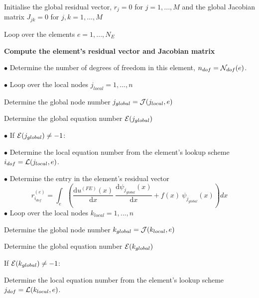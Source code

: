 \begin{DoxyItemize}
\item Initialise the global residual vector, $ r_j=0 $ for $j=1,...,M $ and the global Jacobian matrix $ J_{jk}=0 $ for $j,k=1,...,M $
\item Loop over the elements $ e=1,...,N_E$ \par
\par
 \begin{center} {\bfseries  Compute the element's residual vector and Jacobian matrix } \end{center}  \par
 $ \bullet $ Determine the number of degrees of freedom in this element, $ n_{dof}={\cal N}_{dof}(e) $. \par
 $ \bullet $ Loop over the local nodes $ j_{local}=1,...,n $ \par

\begin{DoxyItemize}
\item Determine the global node number $ j_{global}={\cal J}(j_{local},e)$
\item Determine the global equation number $ {\cal E}( j_{global}) $ \par
 $ \bullet $ If $ {\cal E}( j_{global}) \ne -1 $\-: \par
 \begin{TabularC}{1}
\hline
$ \bullet $ Determine the local equation number from the element's lookup scheme $ i_{dof}= {\cal L}(j_{local},e)$.   \\
\end{TabularC}
$ \bullet $ Determine the entry in the element's residual vector \[ r_{i_{dof}}^{(e)} = \int_{e} \left( \frac{\mbox{d} u^{(FE)}(x)}{\mbox{d} x} \ \frac{\mbox{d} \psi_{j_{global}}(x)}{\mbox{d} x} + f(x) \ \psi_{j_{global}}(x) \right) dx \] $ \bullet $ Loop over the local nodes $ k_{local}=1,...,n $
\begin{DoxyItemize}
\item Determine the global node number $ k_{global}={\cal J}(k_{local},e)$
\item Determine the global equation number $ {\cal E}( k_{global}) $
\item If $ {\cal E}( k_{global}) \ne -1 $\-: \begin{TabularC}{1}
\hline

\begin{DoxyItemize}
\item Determine the local equation number from the element's lookup scheme $ j_{dof}= {\cal L}(k_{local},e)$.   
\end{DoxyItemize}\\
\end{TabularC}


\end{DoxyItemize}
\end{DoxyItemize}
\end{DoxyItemize}
